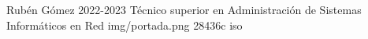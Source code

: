 \documentclass{\ClassPath/yukibook}
\begin{document}
    {Rubén Gómez}  %
    {2022-2023}    %
    {Técnico superior en Administración de \linebreak Sistemas Informáticos en Red} %
    {}%
    {}%
    {img/portada.png} %
    {28436c}
    {iso} %

    \coverpage

    \tableofcontents

    \graphicspath{{img/iso/}}
    
\end{document}
